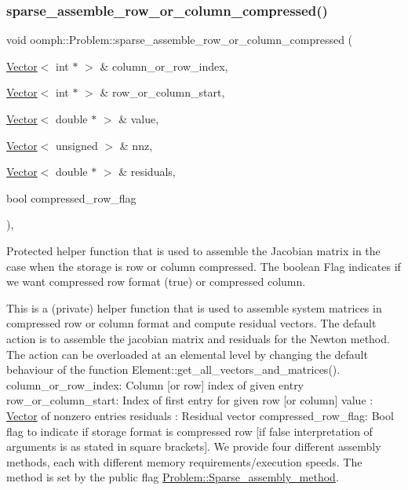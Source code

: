 \subsubsection{\texorpdfstring{sparse\+\_\+assemble\+\_\+row\+\_\+or\+\_\+column\+\_\+compressed()}{sparse\_assemble\_row\_or\_column\_compressed()}}
{\footnotesize\ttfamily void oomph\+::\+Problem\+::sparse\+\_\+assemble\+\_\+row\+\_\+or\+\_\+column\+\_\+compressed (\begin{DoxyParamCaption}\item[{\hyperlink{classoomph_1_1Vector}{Vector}$<$ int $\ast$ $>$ \&}]{column\+\_\+or\+\_\+row\+\_\+index,  }\item[{\hyperlink{classoomph_1_1Vector}{Vector}$<$ int $\ast$ $>$ \&}]{row\+\_\+or\+\_\+column\+\_\+start,  }\item[{\hyperlink{classoomph_1_1Vector}{Vector}$<$ double $\ast$ $>$ \&}]{value,  }\item[{\hyperlink{classoomph_1_1Vector}{Vector}$<$ unsigned $>$ \&}]{nnz,  }\item[{\hyperlink{classoomph_1_1Vector}{Vector}$<$ double $\ast$ $>$ \&}]{residuals,  }\item[{bool}]{compressed\+\_\+row\+\_\+flag }\end{DoxyParamCaption})\hspace{0.3cm}{\ttfamily [protected]}, {\ttfamily [virtual]}}



Protected helper function that is used to assemble the Jacobian matrix in the case when the storage is row or column compressed. The boolean Flag indicates if we want compressed row format (true) or compressed column. 

This is a (private) helper function that is used to assemble system matrices in compressed row or column format and compute residual vectors. The default action is to assemble the jacobian matrix and residuals for the Newton method. The action can be overloaded at an elemental level by changing the default behaviour of the function Element\+::get\+\_\+all\+\_\+vectors\+\_\+and\+\_\+matrices(). column\+\_\+or\+\_\+row\+\_\+index\+: Column \mbox{[}or row\mbox{]} index of given entry row\+\_\+or\+\_\+column\+\_\+start\+: Index of first entry for given row \mbox{[}or column\mbox{]} value \+: \hyperlink{classoomph_1_1Vector}{Vector} of nonzero entries residuals \+: Residual vector compressed\+\_\+row\+\_\+flag\+: Bool flag to indicate if storage format is compressed row \mbox{[}if false interpretation of arguments is as stated in square brackets\mbox{]}. We provide four different assembly methods, each with different memory requirements/execution speeds. The method is set by the public flag \hyperlink{classoomph_1_1Problem_a447f9d42b248f6c394581ff1a0b02513}{Problem\+::\+Sparse\+\_\+assembly\+\_\+method}. 


